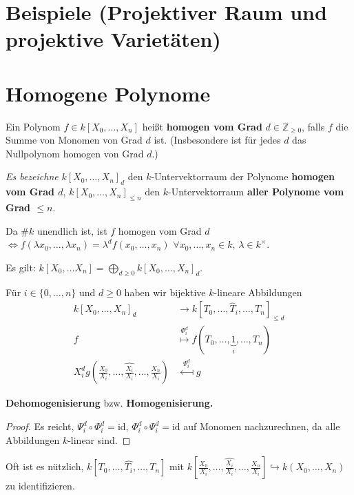 
\section*{Beispiele (Projektiver Raum und projektive Varietäten)}

\section{Homogene Polynome}
\label{sec:homogene-polynome}
\begin{defn}[orig. 48]
  \label{def:homogen}
  Ein Polynom $f\in k[X_{0},\ldots,X_{n}]$ heißt \textbf{homogen vom
    Grad} $d\in\mathbb{Z}_{\geq0}$, falls $f$ die Summe
  von Monomen von Grad $d$ ist. (Insbesondere ist für jedes $d$ das
  Nullpolynom homogen von Grad $d$.)

  \emph{Es bezeichne} $k[X_{0},\ldots,X_{n}]_{d}$ den $k$-Untervektorraum
  der Polynome \textbf{homogen vom Grad $d$}, $k[X_{0}, \ldots, X_{n}]_{\leq n}$ den $k$-Untervektorraum \textbf{aller Polynome vom Grad $\leq n$}.
\end{defn}
\begin{rem}[orig. 49]
  \label{rem:charakterisierung-homogen}
  Da \#$k$ unendlich ist, ist $f$ homogen vom Grad $d$
  $\Leftrightarrow f(\lambda x_{0},\ldots,\lambda x_{n})=\lambda^{d}f(x_{0},\ldots,x_{n})$
  $\forall x_{0},\ldots,x_{n}\in k$, $\lambda\in k^{\times}$. 

  Es gilt: $k[X_{0},\ldots X_{n}]=\bigoplus_{d\geq0}k[X_{0},\ldots,X_{n}]_{d}$.
\end{rem}
\begin{lem}[orig. 50]
  \label{lem:homogenisierung-dehomogenisierung}
  Für $i\in\{0,\ldots,n\}$ und $d\geq0$ haben wir bijektive $k$-lineare
  Abbildungen
  \begin{align*}
    k[X_{0},\ldots,X_{n}]_{d} & \longrightarrow k[T_{0},\ldots,\hat{T}_{i},\ldots,T_{n}]_{\leq d}\\
    f & \overset{\Phi_{i}^{d}}{\longmapsto}f(T_{0},\ldots,\underbrace{1}_{i},\ldots,T_{n})\\
    X_{i}^{d}g\left(\frac{X_{0}}{X_{i}},\ldots,\hat{\frac{X_{i}}{X_{i}}},\ldots,\frac{X_{n}}{X_{i}}\right) & \overset{\Psi_{i}^{d}}{\longmapsfrom}g
  \end{align*}

  \textbf{Dehomogenisierung }bzw. \textbf{Homogenisierung.}
\end{lem}
\begin{proof}
  Es reicht, $\Psi_{i}^{d}\circ\Phi_{i}^{d}=\text{id}$, $\Phi_{i}^{d}\circ\Psi_{i}^{d}=\text{id}$
  auf Monomen nachzurechnen, da alle Abbildungen $k$-linear sind. 
\end{proof}
Oft ist es nützlich, 
$k[T_{0},\ldots,\hat{T_{i}},\ldots,T_{n}]$ mit $k\left[\frac{X_{0}}{X_{i}},\ldots,\hat{\frac{X_{i}}{X_{i}}},\ldots,\frac{X_{n}}{X_{i}}\right] \hookrightarrow k(X_{0},\ldots,X_{n})$ zu identifizieren.

